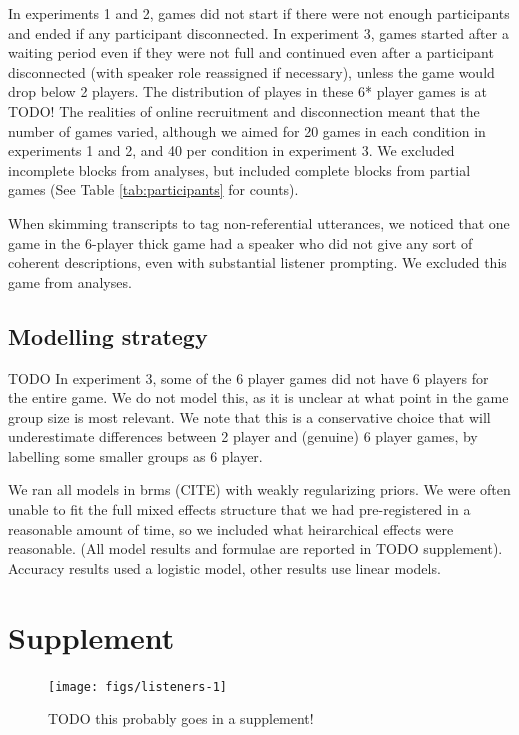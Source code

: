 \documentclass[
  english,
  a4paper,
]{article}
\begin{document}
In experiments 1 and 2, games did not start if there were not enough participants and ended if any participant disconnected. In experiment 3, games started after a waiting period even if they were not full and continued even after a participant disconnected (with speaker role reassigned if necessary), unless the game would drop below 2 players. The distribution of playes in these 6* player games is at TODO! The realities of online recruitment and disconnection meant that the number of games varied, although we aimed for 20 games in each condition in experiments 1 and 2, and 40 per condition in experiment 3. We excluded incomplete blocks from analyses, but included complete blocks from partial games (See Table \ref{tab:participants} for counts).

When skimming transcripts to tag non-referential utterances, we noticed that one game in the 6-player thick game had a speaker who did not give any sort of coherent descriptions, even with substantial listener prompting. We excluded this game from analyses.

\hypertarget{modelling-strategy}{%
\subsection{Modelling strategy}\label{modelling-strategy}}

TODO
In experiment 3, some of the 6 player games did not have 6 players for the entire game. We do not model this, as it is unclear at what point in the game group size is most relevant. We note that this is a conservative choice that will underestimate differences between 2 player and (genuine) 6 player games, by labelling some smaller groups as 6 player.

We ran all models in brms (CITE) with weakly regularizing priors. We were often unable to fit the full mixed effects structure that we had pre-registered in a reasonable amount of time, so we included what heirarchical effects were reasonable. (All model results and formulae are reported in TODO supplement). Accuracy results used a logistic model, other results use linear models.

\hypertarget{supplement}{%
\section{Supplement}\label{supplement}}

\begin{figure}[t!]

{\centering \texttt{[image: figs/listeners-1]} 

}

\caption{TODO this probably goes in a supplement! }\label{fig:listeners}
\end{figure}
\end{document}
